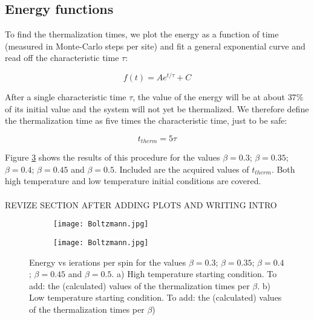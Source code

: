 \documentclass[11pt,a4paper]{article}
\begin{document}
\subsection{Energy functions}
To find the thermalization times, we plot the energy as a function of time (measured in Monte-Carlo steps per site)
 and fit a general exponential curve and read off the characteristic time $\tau$:

\begin{equation}\label{eq:exp_decay}
    f(t)=Ae^{t/\tau} + C
\end{equation}

After a single characteristic time $\tau$, the value of the energy will be at about $37\%$ of its initial value and
 the system will not yet be thermalized. We therefore define the
 thermalization time as five times the characteristic time, just to be safe:
 
\begin{equation*}
    t_{therm} = 5\tau
\end{equation*}

Figure \ref{fig:Evt} shows the results of this procedure for the values $\beta = 0.3$; $\beta = 0.35$;
 $\beta = 0.4$; $\beta = 0.45$ and $\beta = 0.5$. Included are the acquired values of $t_{therm}$. Both 
 high temperature and low temperature initial conditions are covered.
\\
\\
{\color{red}REVIZE SECTION AFTER ADDING PLOTS AND WRITING INTRO}

\begin{figure}[h!]
\centering
\begin{subfigure}{.5\textwidth}
  \centering
  \texttt{[image: Boltzmann.jpg]}
  \caption{}
  \label{fig:Evt_highT}
\end{subfigure}%
\begin{subfigure}{.5\textwidth}
  \centering
  \texttt{[image: Boltzmann.jpg]}
  \caption{}
  \label{fig:Evt_lowT}
\end{subfigure}
\caption{Energy vs ierations per spin for the values $\beta = 0.3$; $\beta = 0.35$;
         $\beta = 0.4$; $\beta = 0.45$ and $\beta = 0.5$. a) High temperature starting condition. 
         {\color{red}To add: the (calculated) values of the thermalization times per $\beta$}.
         b) Low temperature starting condition.
         {\color{red}To add: the (calculated) values of the thermalization times per $\beta$)}}
\label{fig:Evt}
\end{figure}
\end{document}

